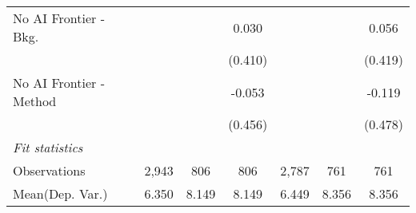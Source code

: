 \begin{tabular}{lcccccc}
   No AI Frontier - Bkg.   &         &         & 0.030       &         &         & 0.056\\   
                           &         &         & (0.410)     &         &         & (0.419)\\   
   No AI Frontier - Method &         &         & -0.053      &         &         & -0.119\\   
                           &         &         & (0.456)     &         &         & (0.478)\\   
   \midrule
   \emph{Fit statistics}\\
   Observations            & 2,943   & 806     & 806         & 2,787   & 761     & 761\\  
Mean(Dep. Var.) & 6.350 & 8.149 & 8.149 & 6.449 & 8.356 & 8.356 \\
   

\end{tabular}
